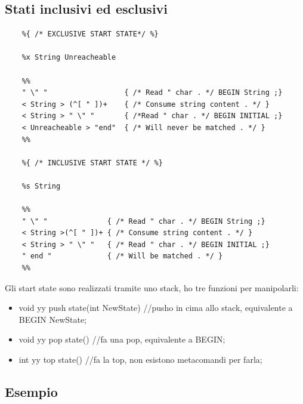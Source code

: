 \subsection{Stati inclusivi ed esclusivi}
\begin{lstlisting}
	%{ /* EXCLUSIVE START STATE*/ %}

	%x String Unreacheable

	%%
	" \" "					{ /* Read " char . */ BEGIN String ;}
	< String > (^[ " ])+	{ /* Consume string content . */ }
	< String > " \" "		{ /*Read " char . */ BEGIN INITIAL ;}
	< Unreacheable > "end"	{ /* Will never be matched . */ }
	%%

	%{ /* INCLUSIVE START STATE */ %}
	
	%s String
	
	%%
	" \" " 				{ /* Read " char . */ BEGIN String ;}
	< String >(^[ " ])+	{ /* Consume string content . */ }
	< String > " \" " 	{ /* Read " char . */ BEGIN INITIAL ;}
	" end "				{ /* Will be matched . */ }
	%%
\end{lstlisting}
Gli start state sono realizzati tramite uno stack, ho tre funzioni per manipolarli:
\begin{itemize}
	\item void yy push state(int NewState) //pusho in cima allo stack, equivalente a BEGIN NewState;\\
	\item void yy pop state() //fa una pop, equivalente a BEGIN;\\
	\item int yy top state() //fa la top, non esistono metacomandi per farla;\\
\end{itemize}

\subsection{Esempio}

